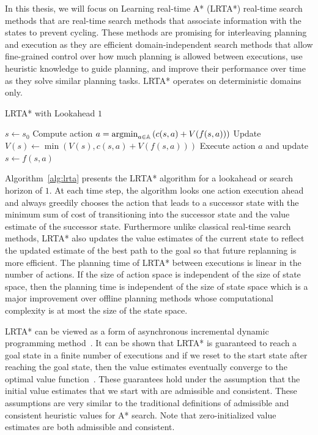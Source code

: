 In this thesis, we will focus on Learning real-time A* (LRTA*) real-time search methods
that are real-time search methods that associate information with the
states to prevent cycling. These methods are promising for
interleaving planning and execution as they are efficient
domain-independent search methods that allow fine-grained control over
how much planning is allowed between executions, use heuristic
knowledge to guide planning, and improve their performance over time
as they solve similar planning tasks. LRTA* operates on deterministic
domains only.

\begin{algorithm}[t]
  \caption{LRTA* with Lookahead $1$~\cite{DBLP:journals/ai/Korf90}}
  \begin{algorithmic}[1]
    \State $s \leftarrow s_0$
    \State Compute action $a = \operatorname*{argmin}_{a \in \mathbb{A}} \left( c(s, a) +
      V(f(s, a)) \right)$
    \State Update $V(s) \leftarrow \min\left( V(s), c(s, a) + V(f(s,
      a)) \right)$
    \State Execute action $a$ and update $s \leftarrow f(s, a)$
    \EndWhile
  \end{algorithmic}
  \label{alg:lrta}
\end{algorithm}

Algorithm~\ref{alg:lrta} presents the LRTA* algorithm for a lookahead
or search horizon of $1$. At each time step, the algorithm looks one
action execution ahead and always greedily chooses the action that
leads to a successor state with the minimum sum of cost of
transitioning into the successor state and the value estimate of the
successor state. Furthermore unlike classical real-time search
methods, LRTA* also updates the value estimates of the current state
to reflect the updated estimate of the best path to the goal so that
future replanning is more efficient. The planning time of LRTA*
between executions is linear in the number of actions. If the size of
action space is independent of the size of state space, then the
planning time is independent of the size of state space which is a
major improvement over offline planning methods whose computational
complexity is at most the size of the state space.

LRTA* can be viewed as a form of asynchronous incremental dynamic
programming method~\cite{DBLP:journals/ai/BartoBS95}. It can be shown
that LRTA* is guaranteed to reach a goal state in a finite number of
executions and if we reset to the start state after reaching the goal
state, then the value estimates eventually converge to the optimal
value function~\cite{DBLP:journals/ai/Korf90}. These guarantees hold
under the assumption that the initial value estimates that we start
with are admissible and consistent. These assumptions are very similar
to the traditional definitions of admissible and consistent heuristic
values for A* search. Note that zero-initialized value estimates are
both admissible and consistent.

